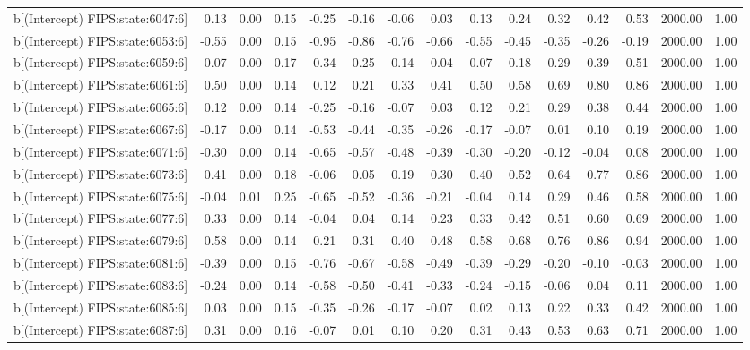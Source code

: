\begin{table}[ht]
\begin{tabular}{rrrrrrrrrrrrrrr}
  b[(Intercept) FIPS:state:6047:6] & 0.13 & 0.00 & 0.15 & -0.25 & -0.16 & -0.06 & 0.03 & 0.13 & 0.24 & 0.32 & 0.42 & 0.53 & 2000.00 & 1.00 \\ 
  b[(Intercept) FIPS:state:6053:6] & -0.55 & 0.00 & 0.15 & -0.95 & -0.86 & -0.76 & -0.66 & -0.55 & -0.45 & -0.35 & -0.26 & -0.19 & 2000.00 & 1.00 \\ 
  b[(Intercept) FIPS:state:6059:6] & 0.07 & 0.00 & 0.17 & -0.34 & -0.25 & -0.14 & -0.04 & 0.07 & 0.18 & 0.29 & 0.39 & 0.51 & 2000.00 & 1.00 \\ 
  b[(Intercept) FIPS:state:6061:6] & 0.50 & 0.00 & 0.14 & 0.12 & 0.21 & 0.33 & 0.41 & 0.50 & 0.58 & 0.69 & 0.80 & 0.86 & 2000.00 & 1.00 \\ 
  b[(Intercept) FIPS:state:6065:6] & 0.12 & 0.00 & 0.14 & -0.25 & -0.16 & -0.07 & 0.03 & 0.12 & 0.21 & 0.29 & 0.38 & 0.44 & 2000.00 & 1.00 \\ 
  b[(Intercept) FIPS:state:6067:6] & -0.17 & 0.00 & 0.14 & -0.53 & -0.44 & -0.35 & -0.26 & -0.17 & -0.07 & 0.01 & 0.10 & 0.19 & 2000.00 & 1.00 \\ 
  b[(Intercept) FIPS:state:6071:6] & -0.30 & 0.00 & 0.14 & -0.65 & -0.57 & -0.48 & -0.39 & -0.30 & -0.20 & -0.12 & -0.04 & 0.08 & 2000.00 & 1.00 \\ 
  b[(Intercept) FIPS:state:6073:6] & 0.41 & 0.00 & 0.18 & -0.06 & 0.05 & 0.19 & 0.30 & 0.40 & 0.52 & 0.64 & 0.77 & 0.86 & 2000.00 & 1.00 \\ 
  b[(Intercept) FIPS:state:6075:6] & -0.04 & 0.01 & 0.25 & -0.65 & -0.52 & -0.36 & -0.21 & -0.04 & 0.14 & 0.29 & 0.46 & 0.58 & 2000.00 & 1.00 \\ 
  b[(Intercept) FIPS:state:6077:6] & 0.33 & 0.00 & 0.14 & -0.04 & 0.04 & 0.14 & 0.23 & 0.33 & 0.42 & 0.51 & 0.60 & 0.69 & 2000.00 & 1.00 \\ 
  b[(Intercept) FIPS:state:6079:6] & 0.58 & 0.00 & 0.14 & 0.21 & 0.31 & 0.40 & 0.48 & 0.58 & 0.68 & 0.76 & 0.86 & 0.94 & 2000.00 & 1.00 \\ 
  b[(Intercept) FIPS:state:6081:6] & -0.39 & 0.00 & 0.15 & -0.76 & -0.67 & -0.58 & -0.49 & -0.39 & -0.29 & -0.20 & -0.10 & -0.03 & 2000.00 & 1.00 \\ 
  b[(Intercept) FIPS:state:6083:6] & -0.24 & 0.00 & 0.14 & -0.58 & -0.50 & -0.41 & -0.33 & -0.24 & -0.15 & -0.06 & 0.04 & 0.11 & 2000.00 & 1.00 \\ 
  b[(Intercept) FIPS:state:6085:6] & 0.03 & 0.00 & 0.15 & -0.35 & -0.26 & -0.17 & -0.07 & 0.02 & 0.13 & 0.22 & 0.33 & 0.42 & 2000.00 & 1.00 \\ 
  b[(Intercept) FIPS:state:6087:6] & 0.31 & 0.00 & 0.16 & -0.07 & 0.01 & 0.10 & 0.20 & 0.31 & 0.43 & 0.53 & 0.63 & 0.71 & 2000.00 & 1.00 \\ 

\end{tabular}
\end{table}
